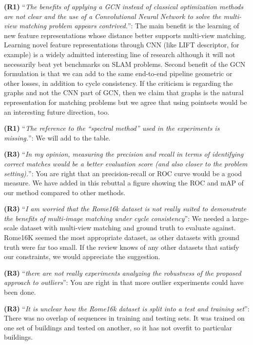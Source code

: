 \documentclass[10pt,twocolumn,letterpaper]{article}
\begin{document}
\textbf{(R1)} ``\textit{The benefits of applying a GCN instead of classical optimization methods are not clear and the use of a Convolutional Neural Network to solve the multi-view matching problem appears contrived.}'':
The main benefit is the learning of new feature representations whose distance better supports multi-view matching. Learning novel feature representations through CNN (like LIFT descriptor, for example) is a widely admitted interesting line of research although it will not necessarily beat yet benchmarks on SLAM problems. Second benefit of the GCN formulation is that we can add to the same end-to-end pipeline geometric or other losses, in addition to cycle consistency. If the criticism is regarding the graphs and not the CNN part of GCN, then we claim that graphs is the natural representation for matching problems but we agree that using pointsets would be an interesting future direction, too.

\textbf{(R1)} ``\textit{The reference to the “spectral method” used in the experiments is missing.}'': 
We will add \cite{pachauri2013solving} to the table.

\textbf{(R3)} ``\textit{In my opinion, measuring the precision and recall in terms of identifying correct matches would be a better evaluation score (and also closer to the problem setting).}'':
You are right that an precision-recall or ROC curve would be a good measure. We have added in this rebuttal a figure showing the ROC and mAP of our method compared to other methods.

\textbf{(R3)} ``\textit{I am worried that the Rome16k dataset is not really suited to demonstrate the benefits of multi-image matching under cycle consistency}'':
We needed a large-scale dataset with multi-view matching and ground truth to evaluate against. Rome16K seemed the most appropriate dataset, as other datasets with ground truth were far too small. If the review knows of any other datasets that satisfy our constraints, we would appreciate the suggestion.

\textbf{(R3)} ``\textit{there are not really experiments analyzing the robustness of the proposed approach to outliers}'':
You are right in that more outlier experiments could have been done. 

\textbf{(R3)} ``\textit{It is unclear how the Rome16k dataset is split into a test and training set}'':
There was no overlap of sequences in training and testing sets. It was trained on one set of buildings and tested on another, so it has not overfit to particular buildings.
\end{document}
